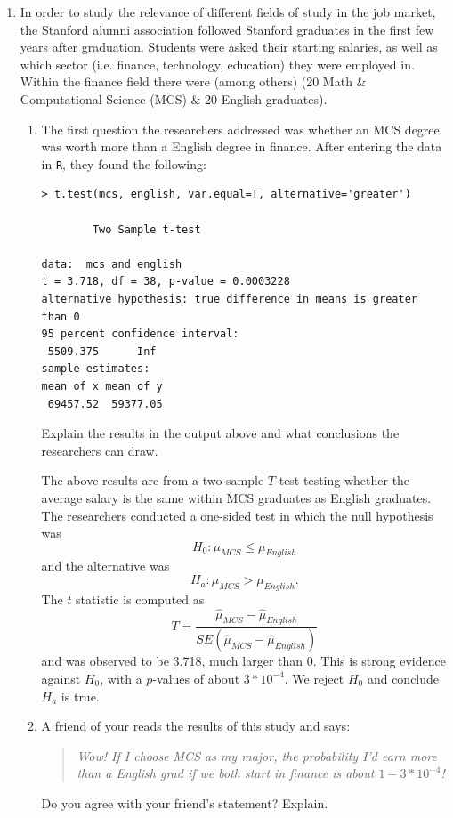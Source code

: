 \documentclass{article}
\begin{document}
\begin{enumerate}


\item In order to study the relevance of different fields of study in the job market, the Stanford alumni association followed Stanford graduates in the first few years after
graduation. Students were asked their starting salaries, as well
as which sector (i.e. finance, technology, education) they were employed in.
Within the finance field there were (among others)
(20 Math \& Computational Science (MCS) \& 20 English
graduates). 

\begin{enumerate}
\item The first question the researchers addressed was whether an MCS degree was worth more than a English degree in  finance. 
After entering the data in  {\tt R}, they found the following:
\begin{verbatim}
> t.test(mcs, english, var.equal=T, alternative='greater')

        Two Sample t-test

data:  mcs and english
t = 3.718, df = 38, p-value = 0.0003228
alternative hypothesis: true difference in means is greater than 0
95 percent confidence interval:
 5509.375      Inf
sample estimates:
mean of x mean of y
 69457.52  59377.05
\end{verbatim}
Explain the results in the output above and what conclusions
the researchers can draw.

{\color{red}

The above results are from a two-sample $T$-test testing whether the average salary
is the same within MCS graduates as English graduates. The researchers conducted a one-sided
test in which the null hypothesis was
$$
H_0: \mu_{MCS} \leq \mu_{English}
$$
and the alternative was
$$
H_a: \mu_{MCS} > \mu_{English}.
$$
The $t$ statistic is computed as
$$
T = \frac{\hat{\mu}_{MCS} - \hat{\mu}_{English}}{SE(\hat{\mu}_{MCS} - \hat{\mu}_{English})}
$$
and was observed to be 3.718, much larger than 0. This is strong evidence against $H_0$, with a 
$p$-values of about $3 * 10^{-4}$. We reject $H_0$ and conclude $H_a$ is true.
}

\newpage

\item A friend of your reads the results of this study and says:
  \begin{quote}
{\em    Wow! If I choose MCS as my major, the probability
I'd earn more than a English grad if we both start in finance is about
$1-3*10^{-4}$!}
  \end{quote}
Do you agree with your friend's statement? Explain.


\end{enumerate}
\end{enumerate}
\end{document}
